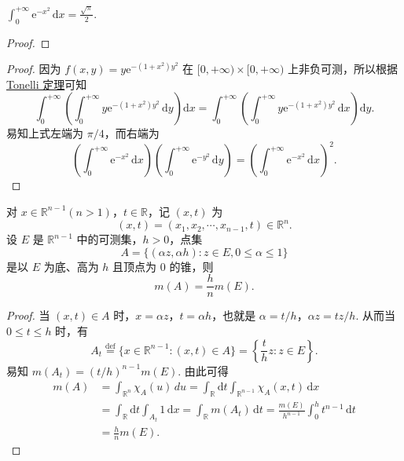 \documentclass[../../main.tex]{subfiles}
\begin{document}
\begin{example}
$\int_0^{+\infty} \mathrm{e}^{-x^2} \, \mathrm{d}x = \frac{\sqrt{\pi}}{2}.$
\end{example}
\begin{proof}

\end{proof}
\begin{proof}
因为 \( f(x, y) = y \mathrm{e}^{-(1 + x^2)y^2} \) 在 \( [0, +\infty) \times [0, +\infty) \) 上非负可测，所以根据\hyperref[theorem:Tonelli 定理 非负可测函数的情形]{Tonelli 定理}可知
\[
\int_0^{+\infty} \left( \int_0^{+\infty} y \mathrm{e}^{-(1 + x^2)y^2} \, \mathrm{d}y \right) \mathrm{d}x = \int_0^{+\infty} \left( \int_0^{+\infty} y \mathrm{e}^{-(1 + x^2)y^2} \, \mathrm{d}x \right) \mathrm{d}y.
\]
易知上式左端为 \( \pi/4 \)，而右端为
\[
\left( \int_0^{+\infty} \mathrm{e}^{-x^2} \, \mathrm{d}x \right) \left( \int_0^{+\infty} \mathrm{e}^{-y^2} \, \mathrm{d}y \right) = \left( \int_0^{+\infty} \mathrm{e}^{-x^2} \, \mathrm{d}x \right)^2.
\]
\end{proof}

\begin{example}
对 \( x \in \mathbb{R}^{n - 1} (n > 1) \)，\( t \in \mathbb{R} \)，记 \( (x, t) \) 为
\[
(x, t) = (x_1, x_2, \cdots, x_{n - 1}, t) \in \mathbb{R}^n.
\]
设 \( E \) 是 \( \mathbb{R}^{n - 1} \) 中的可测集，\( h > 0 \)，点集
\[
A = \{ (\alpha z, \alpha h) : z \in E, 0 \leqslant \alpha \leqslant 1 \}
\]
是以 \( E \) 为底、高为 \( h \) 且顶点为 0 的锥，则
\[
m(A) = \frac{h}{n} m(E).
\]
\end{example}
\begin{proof}
当 \( (x, t) \in A \) 时，\( x = \alpha z \)，\( t = \alpha h \)，也就是 \( \alpha = t/h \)，\( \alpha z = t z / h \). 从而当 \( 0 \leqslant t \leqslant h \) 时，有
\[
A_t \stackrel{\text{def}}{=} \{ x \in \mathbb{R}^{n - 1} : (x, t) \in A \} = \left\{ \frac{t}{h} z : z \in E \right\}.
\]
易知 \( m(A_t) = (t/h)^{n - 1} m(E) \). 由此可得
\begin{align*}
m(A) &= \int_{\mathbb{R}^n} \chi_A(u) \, du = \int_{\mathbb{R}} \mathrm{d}t \int_{\mathbb{R}^{n - 1}} \chi_A(x, t) \, \mathrm{d}x \\
&= \int_{\mathbb{R}} \mathrm{d}t \int_{A_t} 1 \, \mathrm{d}x = \int_{\mathbb{R}} m(A_t) \, \mathrm{d}t = \frac{m(E)}{h^{n - 1}} \int_0^h t^{n - 1} \, \mathrm{d}t \\
&= \frac{h}{n} m(E).
\end{align*}
\end{proof}
\end{document}
